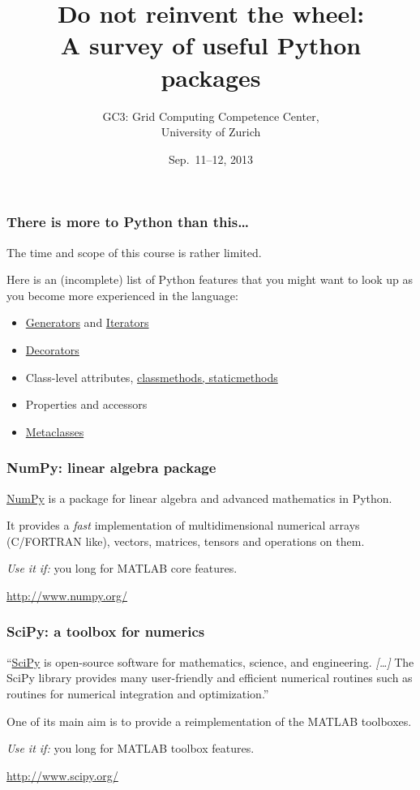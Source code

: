 \documentclass[english,serif,mathserif,xcolor=pdftex,dvipsnames,table]{beamer}
\title[Introduction]{%
  Do not reinvent the wheel:
  \\
  A survey of useful Python packages
}
\author[GC3]{%
  GC3: Grid Computing Competence Center, \\
  University of Zurich
}
\date{Sep.~11--12, 2013}
\begin{document}
\maketitle

\begin{frame}
  \frametitle{There is more to Python than this\ldots}

  The time and scope of this course is rather limited.

  \+
  Here is an (incomplete) list of Python features that you might
  want to look up as you become more experienced in the language:
  \begin{itemize}
  \item
    \href{http://docs.python.org/2/tutorial/classes.html\#generators}{Generators}
    and
    \href{http://docs.python.org/2/tutorial/classes.html\#iterators}{Iterators}
  \item \href{http://www.artima.com/weblogs/viewpost.jsp?thread=240808}{Decorators}
  \item Class-level attributes, \href{http://stackoverflow.com/a/12179752/1808780}{classmethods, staticmethods}
  \item Properties and accessors
  \item \href{http://stackoverflow.com/a/6581949/459543}{Metaclasses}
  \end{itemize}
\end{frame}


\begin{frame}
  \frametitle{NumPy: linear algebra package}

  \href{http://www.numpy.org/}{NumPy} is a package for linear algebra
  and advanced mathematics in Python.

  \+ It provides a \emph{fast} implementation of multidimensional
  numerical arrays (C/FORTRAN like), vectors, matrices, tensors and
  operations on them.

  \+ \emph{Use it if:} you long for MATLAB core features.

  \begin{seealso}
    \url{http://www.numpy.org/}
  \end{seealso}
\end{frame}


\begin{frame}
  \frametitle{SciPy: a toolbox for numerics}

  ``\href{http://www.scipy.org}{SciPy} is open-source software for
  mathematics, science, and engineering. \emph{[\ldots]} The SciPy
  library provides many user-friendly and efficient numerical routines
  such as routines for numerical integration and optimization.''

  \+ One of its main aim is to provide a reimplementation of the
  MATLAB toolboxes.

  \+ \emph{Use it if:} you long for MATLAB toolbox features.

  \begin{seealso}
    \url{http://www.scipy.org/}
  \end{seealso}
\end{frame}
\end{document}
